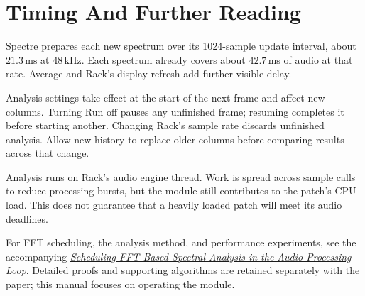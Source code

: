 \section{Timing And Further Reading}\label{sec:further-reading}

Spectre prepares each new spectrum over its 1024-sample update interval,
about $21.3\,\mathrm{ms}$ at $48\,\mathrm{kHz}$. Each spectrum already covers
about $42.7\,\mathrm{ms}$ of audio at that rate. Average and Rack's display
refresh add further visible delay.

Analysis settings take effect at the start of the next frame and affect new
columns. Turning Run off pauses any unfinished frame; resuming completes it
before starting another. Changing Rack's sample rate discards unfinished
analysis. Allow new history to replace older columns before comparing results
across that change.

Analysis runs on Rack's audio engine thread. Work is spread across sample
calls to reduce processing bursts, but the module still contributes to the
patch's CPU load. This does not guarantee that a heavily loaded patch will
meet its audio deadlines.

For FFT scheduling, the analysis method, and performance experiments, see
the accompanying
\href{https://github.com/Kautenja/ArhythmeticUnits-Fourier/tree/main/docs/whitepaper}{\textit{Scheduling FFT-Based Spectral Analysis in the Audio Processing Loop}}.
Detailed proofs and supporting algorithms are retained separately with the
paper; this manual focuses on operating the module.
